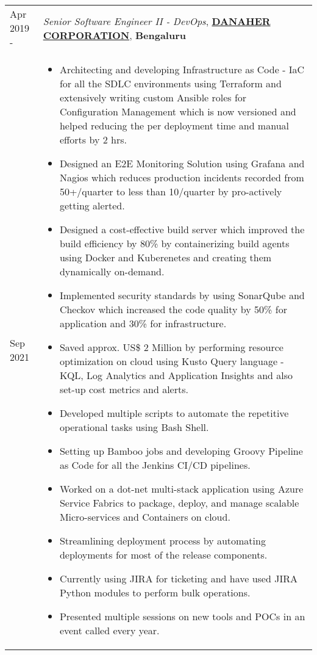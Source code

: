 \documentclass[11pt, a4paper]{article}
\begin{document}
\noindent\begin{tabular}{L{1.7cm}!{\color{gray}\vrule}l}
Apr 2019 -  & \textit{Senior Software Engineer II - DevOps}, \textcolor{NavyBlue}{\textbf{\href{https://www.danaher.com/who-we-are/danaher-story}{DANAHER CORPORATION}}},  \textbf{Bengaluru} \\
Sep 2021 &
  \begin{minipage}[t]{0.86\textwidth}
    \begin{itemize}[leftmargin=*]
    \itemsep-0.1em 
    \vspace{0mm}
    \item Architecting and developing Infrastructure as Code - IaC for all the SDLC environments using Terraform and extensively writing custom Ansible roles for Configuration Management which is now versioned and helped reducing the per deployment time and manual efforts by 2 hrs.
    \item Designed an E2E Monitoring Solution using Grafana and Nagios which reduces production incidents recorded from 50+/quarter to less than 10/quarter by pro-actively getting alerted.
    \item Designed a cost-effective build server which improved the build efficiency by 80\% by containerizing build agents using Docker and Kuberenetes and creating them dynamically on-demand.
    \item Implemented security standards by using SonarQube and Checkov which increased the code quality by 50\% for application and 30\% for infrastructure. 
     \item Saved approx. US\$ 2 Million by performing resource optimization on cloud using Kusto Query language - KQL, Log Analytics and Application Insights and also set-up cost metrics and alerts.
     \item Developed multiple scripts to automate the repetitive operational tasks using Bash Shell.
     \item Setting up Bamboo jobs and developing Groovy Pipeline as Code for all the Jenkins CI/CD pipelines. 
     \item Worked on a dot-net multi-stack application using Azure Service Fabrics to package, deploy, and manage scalable Micro-services and Containers on cloud.
     \item Streamlining deployment process by automating deployments for most of the release components.
     \item Currently using JIRA for ticketing and have used JIRA Python modules to perform bulk operations.
    \item Presented multiple sessions on new tools and POCs in an event called  every year.

\end{itemize}
\end{minipage}
\end{tabular}
\end{document}
